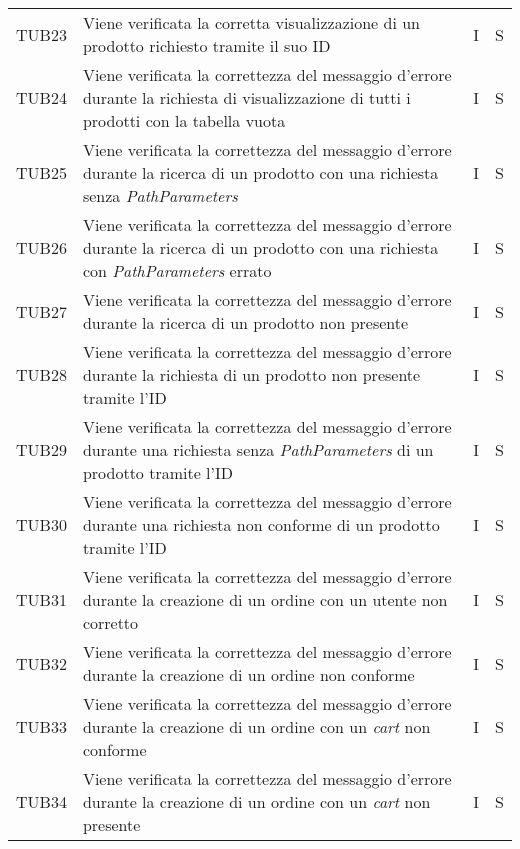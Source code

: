 {\begin{longtable}{C{2cm} C{9.6cm} C{1.5cm} C{1cm}}
TUB23 & Viene verificata la corretta visualizzazione di un prodotto richiesto tramite il suo ID & I & S\\

TUB24 & Viene verificata la correttezza del messaggio d'errore durante la richiesta di visualizzazione di tutti i prodotti con la tabella vuota & I & S\\

TUB25 & Viene verificata la correttezza del messaggio d'errore durante la ricerca di un prodotto con una richiesta senza \textit{PathParameters} & I & S\\

TUB26 & Viene verificata la correttezza del messaggio d'errore durante la ricerca di un prodotto con una richiesta con \textit{PathParameters} errato & I & S\\

TUB27 & Viene verificata la correttezza del messaggio d'errore durante la ricerca di un prodotto non presente & I & S\\

TUB28 & Viene verificata la correttezza del messaggio d'errore durante la richiesta di un prodotto non presente tramite l'ID & I & S\\

TUB29 & Viene verificata la correttezza del messaggio d'errore durante una richiesta senza \textit{PathParameters} di un prodotto tramite l'ID & I & S\\

TUB30 & Viene verificata la correttezza del messaggio d'errore durante una richiesta non conforme di un prodotto tramite l'ID & I & S\\

TUB31 & Viene verificata la correttezza del messaggio d'errore durante la creazione di un ordine con un utente non corretto & I & S\\

TUB32 & Viene verificata la correttezza del messaggio d'errore durante la creazione di un ordine non conforme & I & S\\

TUB33 & Viene verificata la correttezza del messaggio d'errore durante la creazione di un ordine con un \textit{cart} non conforme & I & S\\

TUB34 & Viene verificata la correttezza del messaggio d'errore durante la creazione di un ordine con un \textit{cart} non presente & I & S\\


\end{longtable}}
